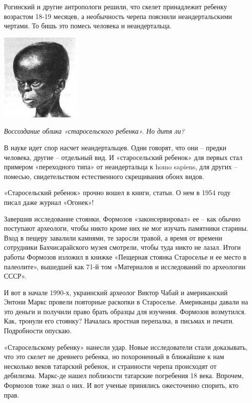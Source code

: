 Рогинский и другие антропологи решили, что скелет принадлежит ребенку возрастом 18-19 месяцев, а необычность черепа пояснили неандертальскими чертами. То бишь это помесь человека и неандертальца.

\begin{center}
\includegraphics[width=0.50\linewidth]{chast-colebanie-osnov/polane/starosel.png}

\textit{Воссоздание облика «старосельского ребенка». Но дитя ли?}
\end{center} 

В науке идет спор насчет неандертальцев. Одни говорят, что они – предки человека, другие – отдельный вид. И «старосельский ребенок» для первых стал примером «переходного типа» от неандертальца к homo sapiens, для других – помесью, свидетельством естественного скрещивания обоих видов.

«Старосельский ребенок» прочно вошел в книги, статьи. О нем в 1954 году писал даже журнал «Огонек»!

Завершив исследование стоянки, Формозов «законсервировал» ее – как обычно поступают археологи, чтобы никто кроме них не мог изучать памятники старины. Вход в пещеру завалили камнями, те заросли травой, а время от времени сотрудники Бахчисарайского музея смотрели, чтобы туда никто не лазал. Итоги работы Формозов изложил в книжке «Пещерная стоянка Староселье и ее место в палеолите», вышедшей как 71-й том «Материалов и исследований по археологии СССР». 

И вот в начале 1990-х, украинский археолог Виктор Чабай и американский Энтони Маркс провели повторные раскопки в Староселье. Американцы давали на это деньги и получили право брать образцы для изучения. Формозов возмутился. Как, тронули его стоянку? Началась яростная перепалка, в письмах и печати. Подробности опускаю.

«Старосельскому ребенку» нанесли удар. Новые исследователи стали доказывать, что это скелет не древнего ребенка, но похороненный в ближайшие к нам несколько веков татарский ребенок, и странности черепа происходят от дебилизма. Маркс-де нашел поблизости татарские погребения 18 века. Впрочем, Формозов тоже знал о них. И вот ученые принялись ожесточенно спорить, кто прав.

